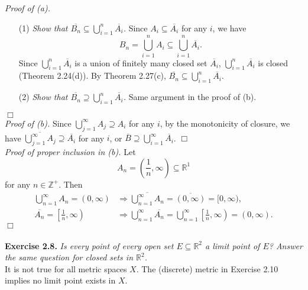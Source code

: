 \documentclass{article}
\begin{document}
\emph{Proof of (a).}
\begin{enumerate}
  \item[(1)]
  \emph{Show that $\overline{B_n} \subseteq \bigcup^{n}_{i=1}{\overline{A_i}}$.}
  Since $A_i \subseteq \overline{A_i}$ for any $i$, we have
  $$B_n = \bigcup^{n}_{i=1} A_i \subseteq \bigcup^{n}_{i=1} \overline{A_i}.$$
  Since $\bigcup^{n}_{i=1} \overline{A_i}$ is a union of finitely many
  closed set $\overline{A_i}$, $\bigcup^{n}_{i=1} \overline{A_i}$ is closed
  (Theorem 2.24(d)).
  By Theorem 2.27(c), $\overline{B_n} \subseteq \bigcup^{n}_{i=1} \overline{A_i}$.
  \item[(2)]
  \emph{Show that $\overline{B_n} \supseteq \bigcup^{n}_{i=1}{\overline{A_i}}$.}
  Same argument in the proof of (b).
\end{enumerate}
$\Box$\\

\emph{Proof of (b).}
Since $\bigcup^{\infty}_{j=1} A_j \supseteq A_i$ for any $i$,
by the monotonicity of closure, we have
$\overline{\bigcup^{\infty}_{j=1} A_j} \supseteq \overline{A_i}$ for any $i$,
or $\overline{B} \supseteq \bigcup^{\infty}_{i=1} \overline{A_i}$.
$\Box$\\

\emph{Proof of proper inclusion in (b).}
Let
$$A_{n} = \left( \frac{1}{n}, \infty \right) \subseteq \mathbb{R}^1$$
for any $n \in \mathbb{Z}^+$.
Then
\begin{align*}
\bigcup^{\infty}_{n=1} A_n = (0, \infty)
&\Longrightarrow
\overline{\bigcup^{\infty}_{n=1} A_n} = \overline{(0, \infty)} = [0, \infty), \\
\overline{A_n} = \left[ \frac{1}{n}, \infty \right)
&\Longrightarrow
\bigcup^{\infty}_{n=1} \overline{A_n}
= \bigcup^{\infty}_{n=1} \left[ \frac{1}{n}, \infty \right)
= (0, \infty).
\end{align*}
$\Box$ \\\\






\textbf{Exercise 2.8.}
\emph{Is every point of every open set $E \subseteq \mathbb{R}^2$ a limit point of $E$?
Answer the same question for closed sets in $\mathbb{R}^2$. } \\

It is not true for all metric spaces $X$.
The (discrete) metric in Exercise 2.10 implies no limit point exists in $X$. \\
\end{document}
